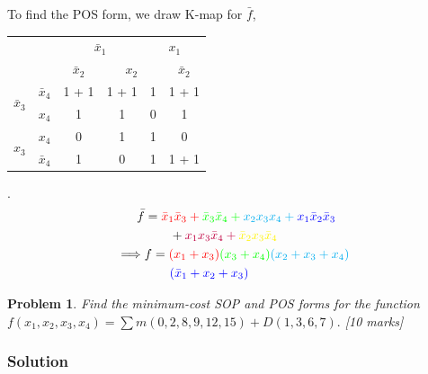 \documentclass[twocolumn]{article}
\newtheorem{prob}{Problem}
\newcommand{\bx}{\bar{x}}
\newcommand{\cred}{\color{red}}
\newcommand{\cg}{\color{green}}
\newcommand{\cb}{\color{blue}}
\begin{document}
To find the POS form, we draw K-map for $\bar{f}$,
\\
\begin{tabular}{c|c|c|c|c|c}
  \toprule
  && \multicolumn{2}{c|}{$\bx_1$} & \multicolumn{2}{c}{$x_1$}
  \\
  && $\bx_2$ & \multicolumn{2}{c|}{$x_2$} & $\bx_2$
  \\ \midrule
  \multirow{2}{*}{$\bx_3$} & $\bx_4$
                                  & \cred 1 + \cg 1 & \cred 1 + \cg 1 & \cg 1 & \cg 1 + \cb 1
  \\
  & $x_4$
                                  & \cred 1 & \cred 1 & 0 & \cb 1
  \\
  \multirow{2}{*}{$x_3$}   &  $x_4$
                                  & 0 & \color{cyan} 1 & \color{cyan} 1 & 0
  \\
  & $\bx_4$
                                  & \color{yellow} 1 & 0 & \color{purple} 1 & \color{purple} 1 + \color{yellow} 1
  \\\bottomrule
\end{tabular}.
\\
\begin{align*}
  \bar{f} &= \cred \bx_1 \bx_3 + \cg \bx_3 \bx_4 + \color{cyan} x_2 x_3 x_4 + \cb x_1
  \bx_2 \bx_3 \\
  &\qquad + \color{purple} x_1 x_3 \bx_4 + \color{yellow} \bx_2 x_3 \bx_4
  \\
  \implies &f = {\cred (x_1 + x_3)}{\cg (x_3 + x_4)}{\color{cyan} (x_2 + x_3 + x_4)}
  \\
             &\qquad {\cb (\bx_1 + x_2 + x_3)}
\end{align*}

\begin{prob}
Find the minimum-cost SOP and POS forms for the function $f(x_1 , x_2 , x_3, x_4) =
\sum m(0, 2, 8, 9, 12, 15) + D(1, 3, 6, 7).$ \cite[Prob
2.40]{brown2013fundamentals} [10 marks]
\end{prob}

\subsubsection*{Solution}
\end{document}
